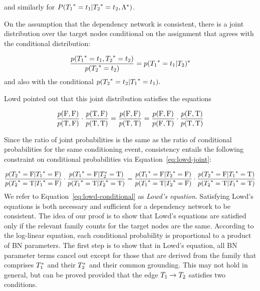 \documentclass[runningheads,a4paper]{llncs}
\begin{document}
and similarly for $P({T_{1}}^{*}\hspace{0.0ex} = t_{1}|{T_{2}}^{*}\hspace{0.0ex} = t_{2},\Lambda^{*}\hspace{0.0ex})$.

On the assumption that the dependency network is consistent, there is a joint distribution over the target nodes conditional on the assignment that agrees with the conditional distribution:

$$\frac{p({T_{1}}^{*}\hspace{0.0ex} = t_{1}, {T_{2}}^{*}\hspace{0.0ex} = t_{2})}{p({T_{2}}^{*}\hspace{0.0ex} = t_{2})}= p({T_{1}}^{*}\hspace{0.0ex} = t_{1}| {T_{2}})^{*}\hspace{0.0ex}$$
and also with the conditional $p({T_{2}}^{*}\hspace{0.0ex} = t_{2}| {T_{1}}^{*}\hspace{0.0ex}=t_{1}).$

Lowd pointed out that 
this joint distribution satisfies the equations

\begin{equation}  \frac{p(\mathrm{F},\mathrm{F})}{p(\mathrm{T},\mathrm{F})} \cdot \frac{p(\mathrm{T},\mathrm{F})}{p(\mathrm{T},\mathrm{T})}= \frac{p(\mathrm{F},\mathrm{F})}{p(\mathrm{T},\mathrm{T})} = \frac{p(\mathrm{F},\mathrm{F})}{p(\mathrm{F},\mathrm{T})} \cdot \frac{p(\mathrm{F},\mathrm{T})}{p(\mathrm{T},\mathrm{T})} \label{eq:lowd-joint}
\end{equation}

Since the ratio of joint probabilities is the same as the ratio of conditional probabilities for the same conditioning event, consistency entails the following constraint on conditional probabilities via Equation~\eqref{eq:lowd-joint}:

\begin{equation}
\frac{p({T_{2}}^{*}\hspace{0.0ex}=\mathrm{F}|{T_{1}}^{*}\hspace{0.0ex}=\mathrm{F})}{p({T_{2}}^{*}\hspace{0.0ex} = \mathrm{T}| {T_{1}}^{*}\hspace{0.0ex}=\mathrm{F})} \cdot \frac{p({T_{1}}^{*}\hspace{0.0ex}=\mathrm{F}|{T}_{2}^{*}\hspace{0.0ex}=\mathrm{T})}{p({T_{1}}^{*}\hspace{0.0ex} = \mathrm{T}| {T_{2}}^{*}\hspace{0.0ex}=\mathrm{T})} =\frac{p({T_{1}}^{*}\hspace{0.0ex}=\mathrm{F}|{T_{2}}^{*}\hspace{0.0ex}=\mathrm{F})}{p({T_{1}}^{*}\hspace{0.0ex} = \mathrm{T}| {T_{2}}^{*}\hspace{0.0ex}=\mathrm{F})} \cdot \frac{p({T_{2}}^{*}\hspace{0.0ex}=\mathrm{F}|{T_{1}}^{*}\hspace{0.0ex}=\mathrm{T})}{p({T_{2}}^{*}\hspace{0.0ex} = \mathrm{T}| {T_{1}}^{*}\hspace{0.0ex}=\mathrm{T})} \label{eq:lowd-conditional}
\end{equation}
We refer to Equation~\ref{eq:lowd-conditional} as {\em Lowd's equation}. 
Satisfying Lowd's equations is both necessary and sufficient for a dependency network to be consistent.
The idea of our proof is to show that Lowd's equations are satisfied only if the relevant family counts for the target nodes are the same. According to the log-linear equation, each conditional probability is proportional to a product of BN parameters. The first step is to show that in Lowd's equation, all BN parameter terms cancel out except for those that are derived from the family that comprises $T_{1}^{*}\hspace{0.0ex}$ and their $T_{2}^{*}\hspace{0.0ex}$ and their common grounding. This may not hold in general, but can be proved provided that the edge $T_{1} \rightarrow T_{2}$ satisfies two conditions.
\end{document}
